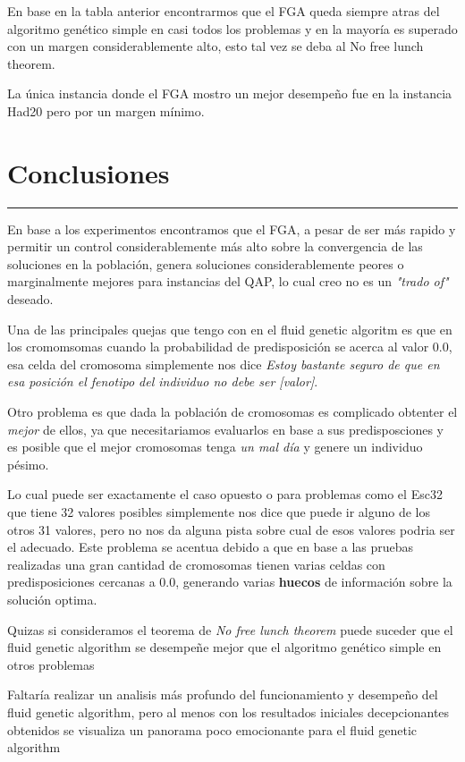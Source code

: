 \documentclass[letterpaper]{article}
\begin{document}
	En base en la tabla anterior encontrarmos que el FGA queda siempre atras
	del algoritmo genético simple en casi todos los problemas y en la mayoría
	es superado con un margen considerablemente alto, esto 
	tal vez se deba al No free lunch theorem.
	
	La única instancia donde el FGA mostro  un mejor desempeño fue
	en la instancia Had20 pero por un margen mínimo.


	\section{Conclusiones}
	\noindent\rule{\textwidth}{1pt}

	En base a los experimentos encontramos que el FGA, a pesar de ser más rapido
	y permitir un control considerablemente más alto sobre la convergencia de
	las soluciones en la población, genera soluciones considerablemente peores o
	marginalmente mejores para instancias del QAP, lo cual creo no es un
	\textit{"trado of"} deseado.

	Una de las principales quejas que tengo con en el fluid genetic algoritm es que 
	en los cromomsomas cuando la probabilidad de predisposición se acerca al valor
	0.0, esa celda del cromosoma simplemente nos dice \textit{Estoy bastante seguro
	de que en esa posición el fenotipo del individuo no debe ser [valor]}.

	Otro problema es que dada la población de cromosomas es complicado obtenter
	el \textit{mejor} de ellos, ya que necesitariamos evaluarlos en base a sus predisposciones
	y es posible que el mejor cromosomas tenga \textit{un mal día} y genere un 
	individuo pésimo.

	Lo cual puede ser exactamente el caso opuesto o para problemas como el 
	Esc32 que tiene 32 valores posibles simplemente nos dice que puede ir alguno
	de los otros 31 valores, pero no nos da alguna pista sobre cual de
	esos valores podria ser el adecuado. Este problema se acentua debido a que
	en base a las pruebas realizadas una gran cantidad de cromosomas tienen 
	varias celdas con predisposiciones cercanas a 0.0, generando varias \textbf{huecos}
	de información sobre la solución optima.


	Quizas si consideramos el teorema de \textit{No free lunch theorem} puede suceder
	que el fluid genetic algorithm se desempeñe mejor que el algoritmo genético 
	simple en otros problemas

	Faltaría realizar un analisis más profundo del funcionamiento y desempeño
	del fluid genetic algorithm, pero al menos con los resultados iniciales decepcionantes
	obtenidos se visualiza un panorama poco emocionante para el fluid genetic algorithm
\end{document}
